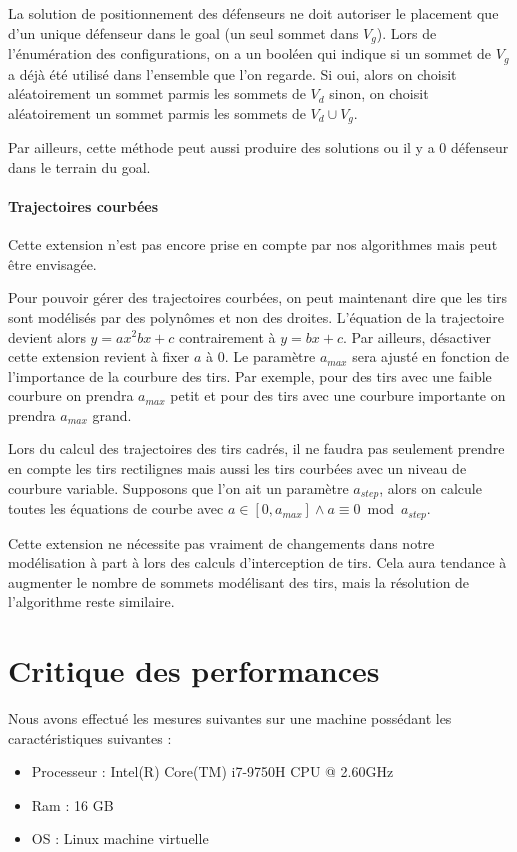\documentclass[12pt]{article}
\begin{document}
La solution de positionnement des défenseurs ne doit autoriser le placement que d'un unique défenseur dans le goal (un seul sommet dans $V_g$).
Lors de l'énumération des configurations, on a un booléen qui indique si un sommet de $V_g$ a déjà été utilisé dans l'ensemble que l'on regarde. Si oui, alors on choisit aléatoirement un sommet parmis les sommets de $V_d$ sinon, on choisit aléatoirement un sommet parmis les sommets de $V_d \cup V_g$.

Par ailleurs, cette méthode peut aussi produire des solutions ou il y a 0 défenseur dans le terrain du goal.

\paragraph{Trajectoires courbées}
Cette extension n'est pas encore prise en compte par nos algorithmes mais peut être envisagée.

Pour pouvoir gérer des trajectoires courbées, on peut maintenant dire que les tirs sont modélisés par des polynômes et non des droites. L'équation de la trajectoire devient alors $y = ax^2 bx + c$ contrairement à $y = bx+c$. Par ailleurs, désactiver cette extension revient à fixer $a$ à 0. Le paramètre $a_{max}$ sera ajusté en fonction de l'importance de la courbure des tirs. Par exemple, pour des tirs avec une faible courbure on prendra $a_{max}$ petit et pour des tirs avec une courbure importante on prendra $a_{max}$ grand.

Lors du calcul des trajectoires des tirs cadrés, il ne faudra pas seulement prendre en compte les tirs rectilignes mais aussi les tirs courbées avec un niveau de courbure variable. Supposons que l'on ait un paramètre $a_{step}$, alors on calcule toutes les équations de courbe avec $a \in [0, a_{max}] \wedge a \equiv 0 \bmod a_{step}$.

Cette extension ne nécessite pas vraiment de changements dans notre modélisation à part à lors des calculs d'interception de tirs. Cela aura tendance à augmenter le nombre de sommets modélisant des tirs, mais la résolution de l'algorithme reste similaire.

\section{Critique des performances}

Nous avons effectué les mesures suivantes sur une machine possédant les caractéristiques suivantes :

\begin{itemize}
  \item Processeur : Intel(R) Core(TM) i7-9750H CPU @ 2.60GHz
  \item Ram : 16 GB
  \item OS : Linux machine virtuelle
\end{itemize}
\end{document}
